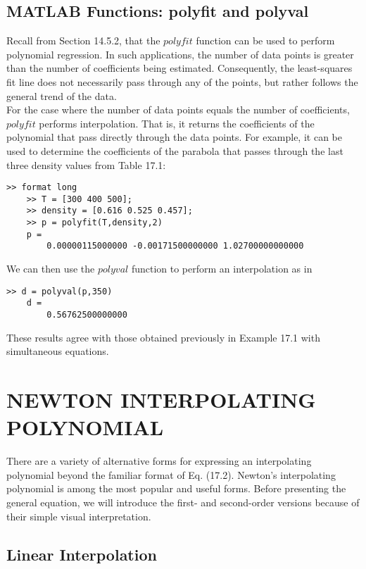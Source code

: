 \documentclass[../main.tex]{subfiles}
\begin{document}
\subsection{MATLAB Functions: polyfit and polyval}
Recall from Section 14.5.2, that the $polyfit$ function can be used to perform polynomial
regression. In such applications, the number of data points is greater than the number of
coefficients being estimated. Consequently, the least-squares fit line does not necessarily
pass through any of the points, but rather follows the general trend of the data.\\
For the case where the number of data points equals the number of coefficients, $polyfit$ performs interpolation. That is, it returns the coefficients of the polynomial that pass
directly through the data points. For example, it can be used to determine the coefficients
of the parabola that passes through the last three density values from Table 17.1:

\begin{lstlisting}[numbers=none]
    >> format long
    >> T = [300 400 500];
    >> density = [0.616 0.525 0.457];
    >> p = polyfit(T,density,2)
    p =
        0.00000115000000 -0.00171500000000 1.02700000000000
\end{lstlisting}
We can then use the $polyval$ function to perform an interpolation as in

\begin{lstlisting}[numbers=none]
    >> d = polyval(p,350)
    d =
        0.56762500000000
\end{lstlisting}
These results agree with those obtained previously in Example 17.1 with simultaneous equations.

\section{NEWTON INTERPOLATING POLYNOMIAL}

There are a variety of alternative forms for expressing an interpolating polynomial beyond
the familiar format of Eq. (17.2). Newton's interpolating polynomial is among the most
popular and useful forms. Before presenting the general equation, we will introduce the
first- and second-order versions because of their simple visual interpretation.

\subsection{Linear Interpolation}
\end{document}

